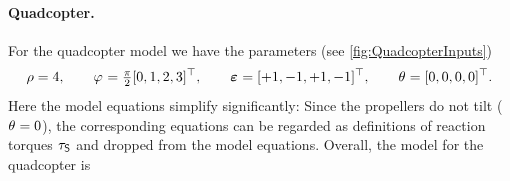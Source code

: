 \paragraph{Quadcopter.}
For the quadcopter model we have the parameters (see \autoref{fig:QuadcopterInputs})
\begin{align}
 \rho = 4,
\qquad
 \varphi_{} = \tfrac{\pi}{2} [0, 1, 2, 3]^\top,
\qquad
 \boldsymbol{\varepsilon_{}} = [+1, -1, +1, -1]^\top,
\qquad
 \theta_{} = [0, 0, 0, 0]^\top.
\end{align}
Here the model equations simplify significantly:
Since the propellers do not tilt ($\theta_{} = 0$), the corresponding equations can be regarded as definitions of reaction torques $\tau_{\mathsf{S}}$ and dropped from the model equations.
Overall, the model for the quadcopter is
